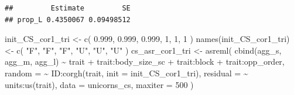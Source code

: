 \documentclass[
  12pt,
]{book}
\newenvironment{Shaded}{\begin{snugshade}}{\end{snugshade}}
\newcommand{\AttributeTok}[1]{\textcolor[rgb]{0.77,0.63,0.00}{#1}}
\newcommand{\DecValTok}[1]{\textcolor[rgb]{0.00,0.00,0.81}{#1}}
\newcommand{\FloatTok}[1]{\textcolor[rgb]{0.00,0.00,0.81}{#1}}
\newcommand{\FunctionTok}[1]{\textcolor[rgb]{0.00,0.00,0.00}{#1}}
\newcommand{\NormalTok}[1]{#1}
\newcommand{\OtherTok}[1]{\textcolor[rgb]{0.56,0.35,0.01}{#1}}
\newcommand{\SpecialCharTok}[1]{\textcolor[rgb]{0.00,0.00,0.00}{#1}}
\newcommand{\StringTok}[1]{\textcolor[rgb]{0.31,0.60,0.02}{#1}}
\begin{document}
\begin{verbatim}
##         Estimate         SE
## prop_L 0.4350067 0.09498512
\end{verbatim}

\begin{Shaded}
\begin{Highlighting}[]
\NormalTok{init\_CS\_cor1\_tri }\OtherTok{\textless{}{-}} \FunctionTok{c}\NormalTok{(}
  \FloatTok{0.999}\NormalTok{,}
  \FloatTok{0.999}\NormalTok{, }\FloatTok{0.999}\NormalTok{,}
  \DecValTok{1}\NormalTok{, }\DecValTok{1}\NormalTok{, }\DecValTok{1}
\NormalTok{)}
\FunctionTok{names}\NormalTok{(init\_CS\_cor1\_tri) }\OtherTok{\textless{}{-}} \FunctionTok{c}\NormalTok{(}
  \StringTok{"F"}\NormalTok{,}
  \StringTok{"F"}\NormalTok{, }\StringTok{"F"}\NormalTok{,}
  \StringTok{"U"}\NormalTok{, }\StringTok{"U"}\NormalTok{, }\StringTok{"U"}
\NormalTok{)}
\NormalTok{cs\_asr\_cor1\_tri }\OtherTok{\textless{}{-}} \FunctionTok{asreml}\NormalTok{(}
  \FunctionTok{cbind}\NormalTok{(agg\_s, agg\_m, agg\_l) }\SpecialCharTok{\textasciitilde{}}\NormalTok{ trait }\SpecialCharTok{+}\NormalTok{ trait}\SpecialCharTok{:}\NormalTok{body\_size\_sc }\SpecialCharTok{+}
\NormalTok{    trait}\SpecialCharTok{:}\NormalTok{block }\SpecialCharTok{+}
\NormalTok{    trait}\SpecialCharTok{:}\NormalTok{opp\_order,}
  \AttributeTok{random =} \SpecialCharTok{\textasciitilde{}}\NormalTok{ ID}\SpecialCharTok{:}\FunctionTok{corgh}\NormalTok{(trait, }\AttributeTok{init =}\NormalTok{ init\_CS\_cor1\_tri),}
\AttributeTok{residual =} \SpecialCharTok{\textasciitilde{}}\NormalTok{ units}\SpecialCharTok{:}\FunctionTok{us}\NormalTok{(trait),}
\AttributeTok{data =}\NormalTok{ unicorns\_cs,}
\AttributeTok{maxiter =} \DecValTok{500}
\NormalTok{)}
\end{Highlighting}
\end{Shaded}
\end{document}
